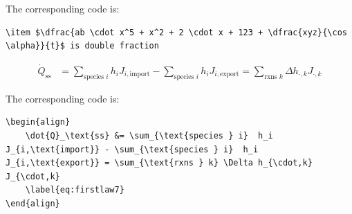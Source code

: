 \documentclass[11pt]{elegantbook}
\begin{document}
The corresponding code is: 
\begin{lstlisting}
\item $\dfrac{ab \cdot x^5 + x^2 + 2 \cdot x + 123 + \dfrac{xyz}{\cos \alpha}}{t}$ is double fraction
\end{lstlisting}

\begin{align}
	\dot{Q}_\text{ss} &= \sum_{\text{species } i}  h_i J_{i,\text{import}} - \sum_{\text{species } i}  h_i J_{i,\text{export}} = \sum_{\text{rxns } k} \Delta h_{\cdot,k} J_{\cdot,k}
	\label{eq:firstlaw7}
\end{align}

The corresponding code is: 
\begin{lstlisting}
\begin{align}
	\dot{Q}_\text{ss} &= \sum_{\text{species } i}  h_i J_{i,\text{import}} - \sum_{\text{species } i}  h_i J_{i,\text{export}} = \sum_{\text{rxns } k} \Delta h_{\cdot,k} J_{\cdot,k}
	\label{eq:firstlaw7}
\end{align}
\end{lstlisting}
\end{document}
